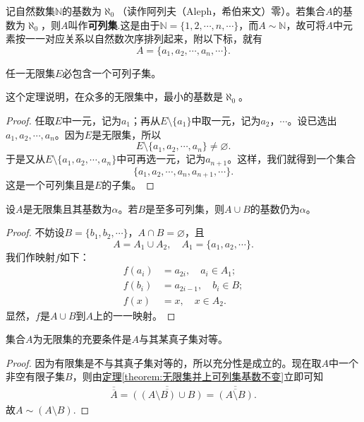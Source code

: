 \documentclass[../../main.tex]{subfiles}
\begin{document}
\begin{definition}\label{definition:自然数集的基数·可列集}
记自然数集\(\mathbb{N}\)的基数为\(\aleph_0\)（读作阿列夫（Aleph，希伯来文）零）。若集合\(A\)的基数为\(\aleph_0\)，则\(A\)叫作\textbf{可列集}.这是由于\(\mathbb{N}=\{1,2,\cdots,n,\cdots\}\)，而\(A\sim\mathbb{N}\)，故可将\(A\)中元素按一一对应关系以自然数次序排列起来，附以下标，就有
\[A = \{a_1,a_2,\cdots,a_n,\cdots\}.\]
\end{definition}

\begin{theorem}\label{theorem:任一无限集必包含一个可列子集}
任一无限集\(E\)必包含一个可列子集。
\end{theorem}
\begin{note}
  这个定理说明，在众多的无限集中，最小的基数是\(\aleph_0\)。
\end{note}
\begin{proof}
  任取\(E\)中一元，记为\(a_1\)；再从\(E\setminus\{a_1\}\)中取一元，记为\(a_2\)，\(\cdots\)。设已选出\(a_1,a_2,\cdots,a_n\)。因为\(E\)是无限集，所以
\[E\setminus\{a_1,a_2,\cdots,a_n\} \neq \varnothing.\]
于是又从\(E\setminus\{a_1,a_2,\cdots,a_n\}\)中可再选一元，记为\(a_{n + 1}\)。这样，我们就得到一个集合
\[\{a_1,a_2,\cdots,a_n,a_{n + 1},\cdots\}.\]
这是一个可列集且是\(E\)的子集。

\end{proof}

\begin{theorem}\label{theorem:无限集并上可列集基数不变}
设\(A\)是无限集且其基数为\(\alpha\)。若\(B\)是至多可列集，则\(A\cup B\)的基数仍为\(\alpha\)。
\end{theorem}
\begin{proof}
  不妨设\(B = \{b_1,b_2,\cdots\}\)，\(A\cap B=\varnothing\)，且
\[A = A_1\cup A_2, \quad A_1 = \{a_1,a_2,\cdots\}.\]
我们作映射\(f\)如下：
\begin{align*}
f(a_i)&=a_{2i}, \quad a_i\in A_1;\\
f(b_i)&=a_{2i - 1}, \quad b_i\in B;\\
f(x)&=x, \quad x\in A_2.
\end{align*}
显然，\(f\)是\(A\cup B\)到\(A\)上的一一映射。

\end{proof}

\begin{theorem}\label{theorem:无限集的充要条件}
集合\(A\)为无限集的充要条件是\(A\)与其某真子集对等。
\end{theorem}
\begin{proof}
因为有限集是不与其真子集对等的，所以充分性是成立的。现在取\(A\)中一个非空有限子集\(B\)，则由\hyperref[theorem:无限集并上可列集基数不变]{定理\ref{theorem:无限集并上可列集基数不变}}立即可知
\begin{align*}
  \overline{\overline{A}}=\overline{\overline{\left( \left( A\setminus B \right) \cup B \right) }}=\overline{\overline{\left( A\setminus B \right) }}.
\end{align*}
故$A\sim \left( A\setminus B \right) $.

\end{proof}
\end{document}
